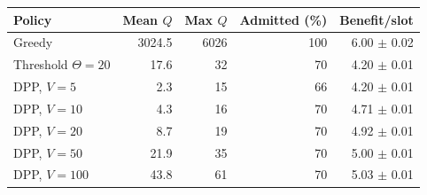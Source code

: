 \begin{tabular}{@{}lrrrr@{}}
\toprule
Policy & Mean $Q$ & Max $Q$ & Admitted (\%) & Benefit/slot \\
\midrule
Greedy & 3024.5 & 6026 & 100 & 6.00 $\pm$ 0.02 \\
Threshold $\Theta=20$ & 17.6 & 32 & 70 & 4.20 $\pm$ 0.01 \\
DPP, $V=5$ & 2.3 & 15 & 66 & 4.20 $\pm$ 0.01 \\
DPP, $V=10$ & 4.3 & 16 & 70 & 4.71 $\pm$ 0.01 \\
DPP, $V=20$ & 8.7 & 19 & 70 & 4.92 $\pm$ 0.01 \\
DPP, $V=50$ & 21.9 & 35 & 70 & 5.00 $\pm$ 0.01 \\
DPP, $V=100$ & 43.8 & 61 & 70 & 5.03 $\pm$ 0.01 \\
\bottomrule
\end{tabular}
